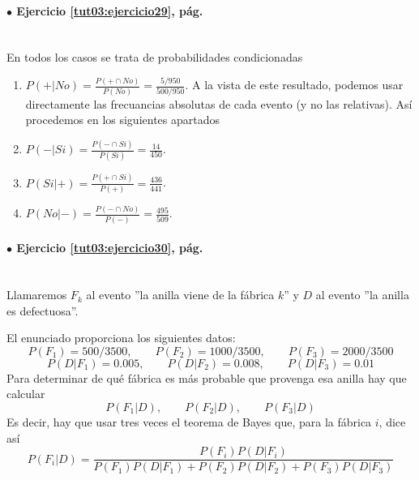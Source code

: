 \documentclass[10pt,a4paper]{article}\usepackage[]{graphicx}\usepackage[]{color}
\newcounter {cont01}
\begin{document}
\paragraph{\bf $\bullet$ Ejercicio \ref{tut03:ejercicio29}, pág. \pageref{tut03:ejercicio29}}
\label{tut03:ejercicio29:sol}\quad\\
En todos los casos se trata de probabilidades condicionadas
\begin{enumerate}
\item $ P(+|No) =\frac{P(+\cap No)} {P(No)}=\frac{5/950}{500/950} $. A la vista de este resultado, podemos usar directamente las frecuancias absolutas de cada evento (y no las relativas). Así procedemos en los siguientes apartados
\item $ P(-|Si) =\frac{P(-\cap Si)} {P(Si)}=\frac{14}{450} $.
\item $ P(Si|+) =\frac{P(+\cap Si)} {P(+)}=\frac{436}{441} $.
\item $ P(No|-) =\frac{P(-\cap No)} {P(-)}=\frac{495}{509} $.
\end{enumerate}

\paragraph{\bf $\bullet$ Ejercicio \ref{tut03:ejercicio30}, pág. \pageref{tut03:ejercicio30}}
\label{tut03:ejercicio30:sol}\quad\\
Llamaremos $F_k$ al evento ''la anilla viene de la fábrica $k$'' y $D$ al evento ''la anilla es defectuosa''.

El enunciado proporciona los siguientes datos: 
$$P(F_1)=500/3500,\qquad P(F_2)=1000/3500, \qquad P(F_3)=2000/3500 $$
$$P(D|F_1)=0\text{.}005,\qquad P(D|F_2)=0\text{.}008, \qquad P(D|F_3)=0\text{.}01$$ 
Para determinar de qu\'e fábrica es más probable que provenga esa anilla hay que calcular 
$$P(F_1|D),\qquad P(F_2|D), \qquad P(F_3|D)$$ 
Es decir, hay que usar tres veces el teorema de Bayes que, para la fábrica $i$, dice así
$$P(F_i|D) = \frac{P(F_i)P(D|F_i)}{P(F_1)P(D|F_1)+P(F_2)P(D|F_2)+P(F_3)P(D|F_3)}$$
\end{document}
